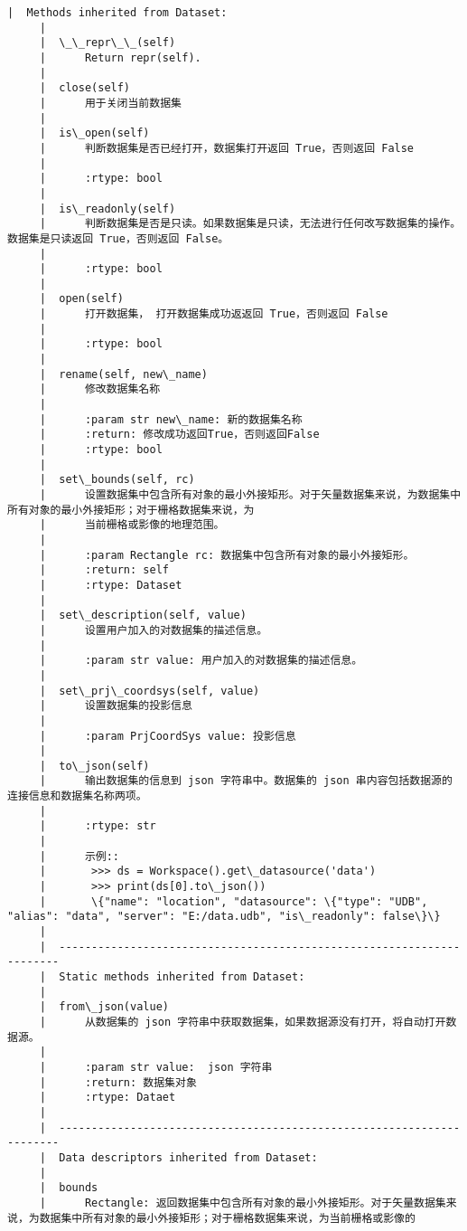 \documentclass[11pt]{article}
\begin{document}
\begin{Verbatim}[commandchars=\\\{\}]
     |  Methods inherited from Dataset:
     |  
     |  \_\_repr\_\_(self)
     |      Return repr(self).
     |  
     |  close(self)
     |      用于关闭当前数据集
     |  
     |  is\_open(self)
     |      判断数据集是否已经打开，数据集打开返回 True，否则返回 False
     |      
     |      :rtype: bool
     |  
     |  is\_readonly(self)
     |      判断数据集是否是只读。如果数据集是只读，无法进行任何改写数据集的操作。 数据集是只读返回 True，否则返回 False。
     |      
     |      :rtype: bool
     |  
     |  open(self)
     |      打开数据集， 打开数据集成功返返回 True，否则返回 False
     |      
     |      :rtype: bool
     |  
     |  rename(self, new\_name)
     |      修改数据集名称
     |      
     |      :param str new\_name: 新的数据集名称
     |      :return: 修改成功返回True，否则返回False
     |      :rtype: bool
     |  
     |  set\_bounds(self, rc)
     |      设置数据集中包含所有对象的最小外接矩形。对于矢量数据集来说，为数据集中所有对象的最小外接矩形；对于栅格数据集来说，为
     |      当前栅格或影像的地理范围。
     |      
     |      :param Rectangle rc: 数据集中包含所有对象的最小外接矩形。
     |      :return: self
     |      :rtype: Dataset
     |  
     |  set\_description(self, value)
     |      设置用户加入的对数据集的描述信息。
     |      
     |      :param str value: 用户加入的对数据集的描述信息。
     |  
     |  set\_prj\_coordsys(self, value)
     |      设置数据集的投影信息
     |      
     |      :param PrjCoordSys value: 投影信息
     |  
     |  to\_json(self)
     |      输出数据集的信息到 json 字符串中。数据集的 json 串内容包括数据源的连接信息和数据集名称两项。
     |      
     |      :rtype: str
     |      
     |      示例::
     |       >>> ds = Workspace().get\_datasource('data')
     |       >>> print(ds[0].to\_json())
     |       \{"name": "location", "datasource": \{"type": "UDB", "alias": "data", "server": "E:/data.udb", "is\_readonly": false\}\}
     |  
     |  ----------------------------------------------------------------------
     |  Static methods inherited from Dataset:
     |  
     |  from\_json(value)
     |      从数据集的 json 字符串中获取数据集，如果数据源没有打开，将自动打开数据源。
     |      
     |      :param str value:  json 字符串
     |      :return: 数据集对象
     |      :rtype: Dataet
     |  
     |  ----------------------------------------------------------------------
     |  Data descriptors inherited from Dataset:
     |  
     |  bounds
     |      Rectangle: 返回数据集中包含所有对象的最小外接矩形。对于矢量数据集来说，为数据集中所有对象的最小外接矩形；对于栅格数据集来说，为当前栅格或影像的

\end{Verbatim}
\end{document}
